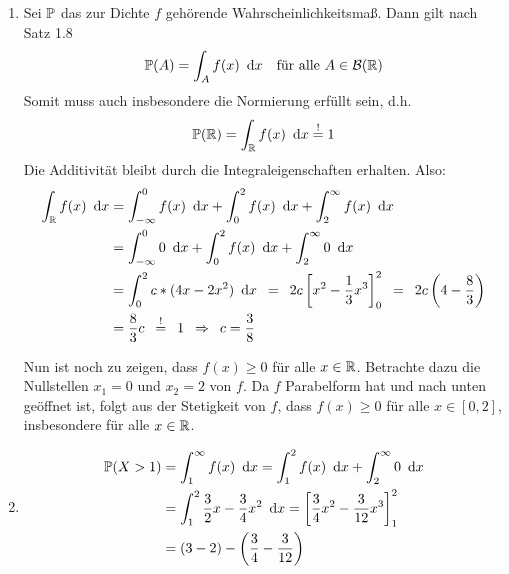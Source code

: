 \begin{exercisePage}
    \begin{enumerate}[leftmargin=*, label=(\alph*)]
        \item Sei $\P$ das zur Dichte $f$ gehörende Wahrscheinlichkeitsmaß. Dann gilt nach Satz 1.8
        \begin{equation*}
        \P(A) = \int_A f(x) \dx \quad \text{für alle } A \in \borel\R
        \end{equation*}
        Somit muss auch insbesondere die Normierung erfüllt sein, d.h.
        \begin{equation*}
        \P(\R) = \int_\R f(x) \dx \overset{!}{=} 1
        \end{equation*}
        Die Additivität bleibt durch die Integraleigenschaften erhalten. Also:
        \begin{equation*}
        \begin{aligned}
        \int_\R f(x) \dx &= \int_{-\infty}^0 f(x) \dx + \int_0^2 f(x) \dx + \int_2^\infty f(x) \dx \\
        &= \int_{-\infty}^0 0 \dx + \int_0^2 f(x) \dx + \int_2^\infty 0 \dx \\
        &= \int_0^2 c * (4x - 2x^2) \dx 
        \enskip = \enskip 2c \left[ x^2 - \frac{1}{3} x^3 \right]_0^2
        \enskip = \enskip 2c \left( 4 - \frac{8}{3} \right) \\
        &= \frac{8}{3} c \enskip \overset{!}{=} \enskip 1 
        \follows c = \frac{3}{8}
        \end{aligned}
        \end{equation*}
        \begin{correction}
        	Nun ist noch zu zeigen, dass $f(x) \geq 0$ für alle $x \in \R$. Betrachte dazu die Nullstellen $x_1 = 0$ und $x_2 = 2$ von $f$. Da $f$ Parabelform hat und nach unten geöffnet ist, folgt aus der Stetigkeit von $f$, dass $f(x) \geq 0$ für alle $x \in [0,2]$, insbesondere für alle $x \in \R$.
        \end{correction}
        \item 
        \begin{equation*}
            \begin{aligned}
            \P(X > 1) &= \int_1^\infty f(x) \dx 
            = \int_1^2 f(x) \dx + \int_2^\infty 0 \dx \\
            &= \int_1^2 \frac{3}{2} x - \frac{3}{4} x^2 \dx
            = \left[ \frac{3}{4} x^2 - \frac{3}{12} x^3 \right]_1^2 \\
            &= \left( 3-2 \right) - \left( \frac{3}{4} - \frac{3}{12} \right) 

\end{aligned}
\end{equation*}
\end{enumerate}
\end{exercisePage}
